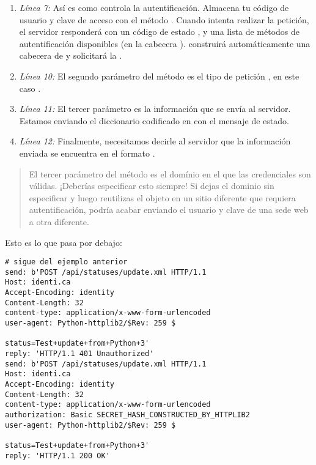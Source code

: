 \begin{enumerate}

\item \emph{Línea 7:} Así es como  controla la autentificación. Almacena tu código de usuario y clave de acceso con el método . Cuando  intenta realizar la petición, el servidor responderá con un código de estado , y una lista de métodos de autentificación disponibles (en la cabecera ).  construirá automáticamente una cabecera de  y solicitará la .

\item \emph{Línea 10:} El segundo parámetro del método  es el tipo de petición , en este caso .

\item \emph{Línea 11:} El tercer parámetro es la información que se envía al servidor. Estamos enviando el diccionario codificado en  con el mensaje de estado.

\item \emph{Línea 12:} Finalmente, necesitamos decirle al servidor que la información enviada se encuentra en el formato .

\end{enumerate}

\begin{quote}
El tercer parámetro del método  es el domínio en el que las credenciales son válidas. ¡Deberías especificar esto siempre! Si dejas el dominio sin especificar y luego reutilizas el objeto  en un sitio diferente que requiera autentificación,  podría acabar enviando el usuario y clave de una sede web a otra diferente.
\end{quote}

Esto es lo que pasa por debajo:

\noindent\begin{minipage}{\textwidth}
\begin{lstlisting}[mathescape=False]
# sigue del ejemplo anterior
send: b'POST /api/statuses/update.xml HTTP/1.1
Host: identi.ca
Accept-Encoding: identity
Content-Length: 32
content-type: application/x-www-form-urlencoded
user-agent: Python-httplib2/$Rev: 259 $

status=Test+update+from+Python+3'
reply: 'HTTP/1.1 401 Unauthorized'
send: b'POST /api/statuses/update.xml HTTP/1.1
Host: identi.ca
Accept-Encoding: identity
Content-Length: 32
content-type: application/x-www-form-urlencoded
authorization: Basic SECRET_HASH_CONSTRUCTED_BY_HTTPLIB2
user-agent: Python-httplib2/$Rev: 259 $

status=Test+update+from+Python+3'
reply: 'HTTP/1.1 200 OK'       
\end{lstlisting}
\end{minipage}

